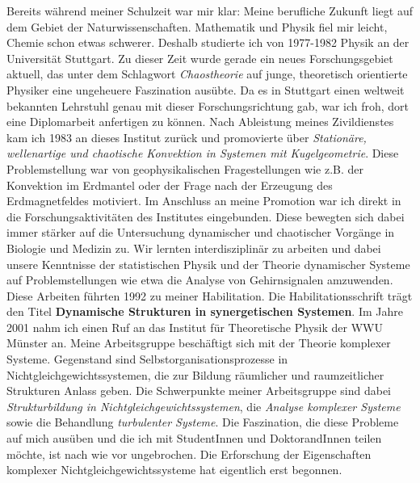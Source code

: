 \documentclass[12pt,a4paper,english]{article}
\begin{document}
\Large
Bereits w\"ahrend meiner Schulzeit war mir klar: Meine berufliche
Zukunft liegt auf dem Gebiet der Naturwissenschaften. Mathematik
und Physik fiel mir leicht, Chemie schon etwas schwerer. 
Deshalb studierte ich von 1977-1982  
Physik an der Universit\"at Stuttgart. Zu dieser Zeit wurde gerade 
ein neues Forschungsgebiet aktuell, das unter dem Schlagwort
{\em Chaostheorie} auf junge, theoretisch orientierte Physiker
eine ungeheuere Faszination aus\"ubte. Da es in Stuttgart 
einen weltweit bekannten Lehrstuhl genau mit dieser Forschungsrichtung
gab, war ich froh, dort eine Diplomarbeit anfertigen zu k\"onnen. 
Nach Ableistung meines 
Zivildienstes kam ich 1983 an dieses Institut zur\"uck und promovierte
\"uber {\em Station\"are, wellenartige und chaotische Konvektion in
Systemen mit Kugelgeometrie}. Diese Problemstellung war von
geophysikalischen Fragestellungen wie z.B. der Konvektion im Erdmantel
oder der Frage nach der Erzeugung des Erdmagnetfeldes
motiviert. Im Anschluss an meine Promotion war ich direkt in die
Forschungsaktivit\"aten des Institutes eingebunden. Diese
bewegten sich dabei immer st\"arker auf die
Untersuchung dynamischer und chaotischer Vorg\"ange in Biologie und Medizin
zu. Wir lernten interdisziplin\"ar zu arbeiten und dabei
unsere Kenntnisse der statistischen Physik und der Theorie dynamischer
Systeme auf Problemstellungen wie etwa die Analyse von Gehirnsignalen
amzuwenden. Diese Arbeiten f\"uhrten 1992 zu meiner Habilitation. Die 
Habilitationsschrift tr\"agt den Titel {\bf Dynamische Strukturen in 
synergetischen Systemen}. Im Jahre 2001 nahm ich einen Ruf an das
Institut f\"ur Theoretische Physik der WWU M\"unster an. 
Meine Arbeitsgruppe besch\"aftigt sich mit der Theorie komplexer
Systeme. Gegenstand sind Selbstorganisationsprozesse in
Nichtgleichgewichtssystemen, die zur Bildung r\"aumlicher und
raumzeitlicher Strukturen Anlass geben. 
Die
Schwerpunkte meiner Arbeitsgruppe sind dabei {\em Strukturbildung in
Nichtgleichgewichtssystemen}, die {\em Analyse komplexer Systeme} sowie die
Behandlung {\em turbulenter Systeme}. 
Die Faszination, die diese Probleme
auf mich aus\"uben und die ich mit StudentInnen und DoktorandInnen
teilen m\"ochte, ist nach wie vor ungebrochen. 
Die Erforschung der Eigenschaften komplexer
Nichtgleichgewichtssysteme hat eigentlich erst begonnen.             
     
\end{document}
